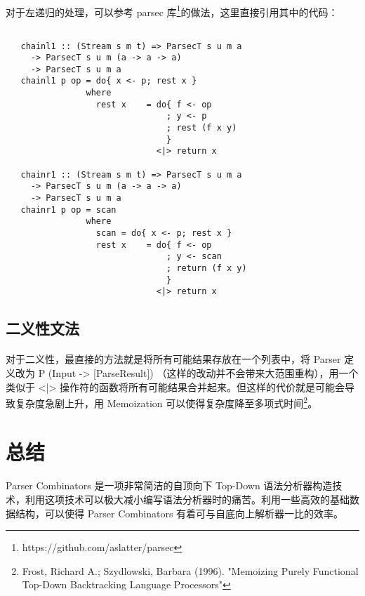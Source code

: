 \documentclass{article}
\begin{document}
   \paragraph{}
    对于左递归的处理，可以参考 parsec 库\footnote{https://github.com/aslatter/parsec}的做法，这里直接引用其中的代码：
   \begin{lstlisting}
   
   chainl1 :: (Stream s m t) => ParsecT s u m a 
     -> ParsecT s u m (a -> a -> a) 
     -> ParsecT s u m a
   chainl1 p op = do{ x <- p; rest x }
                where
                  rest x    = do{ f <- op
                                ; y <- p
                                ; rest (f x y)
                                }
                              <|> return x

   chainr1 :: (Stream s m t) => ParsecT s u m a 
     -> ParsecT s u m (a -> a -> a) 
     -> ParsecT s u m a
   chainr1 p op = scan
                where
                  scan = do{ x <- p; rest x }
                  rest x    = do{ f <- op
                                ; y <- scan
                                ; return (f x y)
                                }
                              <|> return x
   \end{lstlisting}
  \subsection{二义性文法}
   \paragraph{}
    对于二义性，最直接的方法就是将所有可能结果存放在一个列表中，将 Parser 定义改为 P (Input -> [ParseResult]) （这样的改动并不会带来大范围重构），用一个类似于 <|> 操作符的函数将所有可能结果合并起来。但这样的代价就是可能会导致复杂度急剧上升，用 Memoization 可以使得复杂度降至多项式时间\footnote{Frost, Richard A.; Szydlowski, Barbara (1996). "Memoizing Purely Functional Top-Down Backtracking Language Processors"}。
    
 \section{总结}
  \paragraph{}
   Parser Combinators 是一项非常简洁的自顶向下 Top-Down 语法分析器构造技术，利用这项技术可以极大减小编写语法分析器时的痛苦。利用一些高效的基础数据结构，可以使得 Parser Combinators 有着可与自底向上解析器一比的效率。
 \nocite{*}
 
     
\end{document}
